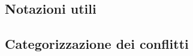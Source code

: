 \documentclass[../../relazione.tex]{subfiles}
\begin{document}
\subsection{Notazioni utili}


\subsection{Categorizzazione dei conflitti}

\end{document}
